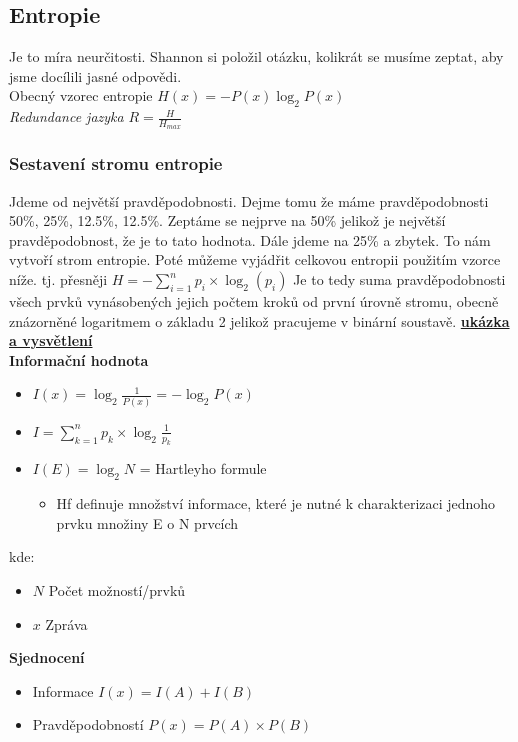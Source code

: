 \documentclass{article}
\begin{document}
\subsection{Entropie}
Je to míra neurčitosti. Shannon si položil otázku, kolikrát se musíme zeptat, aby jsme docílili jasné odpovědi. \\
Obecný vzorec entropie $H\left(x\right)=-P\left(x\right)\log_2P\left(x\right)$\\
\textit{Redundance jazyka} $R=\frac{H}{H_{max}}$
    \subsubsection{Sestavení stromu entropie}
    Jdeme od největší pravděpodobnosti. Dejme tomu že máme pravděpodobnosti 50\%, 25\%, 12.5\%, 12.5\%. Zeptáme se nejprve na 50\% jelikož je největší pravděpodobnost, že je to tato hodnota.
    Dále jdeme na 25\% a zbytek. To nám vytvoří strom entropie. Poté můžeme vyjádřit celkovou entropii použitím vzorce níže. tj. přesněji $H=-\sum_{i=1}^{n}p_i\times\log_2\left(p_i\right)$ Je to tedy suma pravděpodobnosti všech prvků vynásobených jejich počtem kroků od první úrovně stromu, obecně znázorněné logaritmem o základu 2 jelikož pracujeme v binární soustavě. \href{https://cs.khanacademy.org/computing/computer-science/informationtheory/moderninfotheory/v/information-entropy}{\textbf{ukázka a vysvětlení}}\\
\textbf{Informační hodnota}
    \begin{itemize}
        \item $I\left(x\right)=\log_2\frac{1}{P(x)}=-\log_2P\left(x\right)$
        \item $I=\sum_{k=1}^{n}p_k\times \log_2 \frac{1}{p_k}$
        \item $I\left(E\right)=\log_2N$ = Hartleyho formule
        \begin{itemize}
            \item Hf definuje množství informace, které je nutné k charakterizaci jednoho prvku množiny E o N prvcích
        \end{itemize}
    \end{itemize}
    kde:
    \begin{itemize}
        \item $N$ Počet možností/prvků
        \item $x$ Zpráva
    \end{itemize}
\textbf{Sjednocení}
\begin{itemize}
    \item Informace $I(x)=I(A)+I(B)$
    \item Pravděpodobností $P(x)=P(A)\times P(B)$
\end{itemize}
\end{document}
